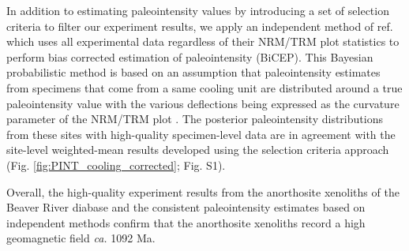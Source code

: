 \documentclass[9pt,twocolumn,twoside,lineno]{pnas-new}
\begin{document}
In addition to estimating paleointensity values by introducing a set of selection criteria to filter our experiment results, we apply an independent method of ref. \citealp{Cych2021a} which uses all experimental data regardless of their NRM/TRM plot statistics to perform bias corrected estimation of paleointensity (BiCEP). This Bayesian probabilistic method is based on an assumption that paleointensity estimates from specimens that come from a same cooling unit are distributed around a true paleointensity value with the various deflections being expressed as the curvature parameter of the NRM/TRM plot \cite{Paterson2011a}. The posterior paleointensity distributions from these sites with high-quality specimen-level data are in agreement with the site-level weighted-mean results developed using the selection criteria approach (Fig. \ref{fig:PINT_cooling_corrected}; Fig. S1).

Overall, the high-quality experiment results from the anorthosite xenoliths of the Beaver River diabase and the consistent paleointensity estimates based on independent methods confirm that the anorthosite xenoliths record a high geomagnetic field \textit{ca.} 1092 Ma. 


\end{document}

